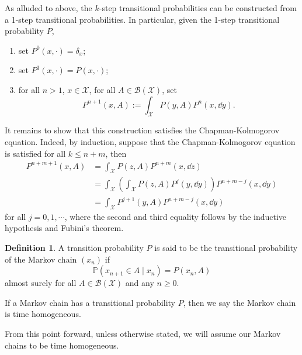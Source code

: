\documentclass[]{article}
\theoremstyle{definition}
\theoremstyle{definition}
\newtheorem{definition}{Definition}[section]
\begin{document}
As alluded to above, the \(k\)-step transitional probabilities can be constructed from a 
1-step transitional probabilities. In particular, given the 1-step transitional 
probability \(P\),
\begin{enumerate}
  \item set \(P^0(x, \cdot) = \delta_x\);
  \item set \(P^1(x, \cdot) = P(x, \cdot)\);
  \item for all \(n > 1\), \(x \in \mathcal{X}\), for all \(A \in \mathcal{B}(\mathcal{X})\), set 
    \[P^{n + 1}(x, A) := \int_{\mathcal{X}} P(y, A) P^n(x, \dd y).\]
\end{enumerate}
It remains to show that this construction satisfies the Chapman-Kolmogorov equation.
Indeed, by induction, suppose that the Chapman-Kolmogorov equation is satisfied for 
all \(k \le n + m\), then 
\[\begin{split}
  P^{n + m + 1}(x, A) & = \int_{\mathcal{X}}P(z, A)P^{n + m}(x, \dd z) \\
  & = \int_{\mathcal{X}}\left(\int_{\mathcal{X}} P(z, A) P^j(y, \dd y)\right) P^{n + m - j}(x, \dd y)\\
  & = \int_{\mathcal{X}}P^{j + 1}(y, A)P^{n + m - j}(x, \dd y)
\end{split}\]
for all \(j = 0, 1, \cdots\), where the second and third equality follows by the 
inductive hypothesis and Fubini's theorem.

\begin{definition}
  A transition probability \(P\) is said to  be the transitional probability of 
  the Markov chain \((x_n)\) if 
  \[\mathbb{P}(x_{n + 1} \in A \mid x_n) = P(x_n, A)\]
  almost surely for all \(A \in \mathcal{B}(\mathcal{X})\) and any \(n \ge 0\).

  If a Markov chain has a transitional probability \(P\), then we say the Markov 
  chain is time homogeneous.
\end{definition}

From this point forward, unless otherwise stated, we will assume our Markov chains 
to be time homogeneous.
\end{document}
